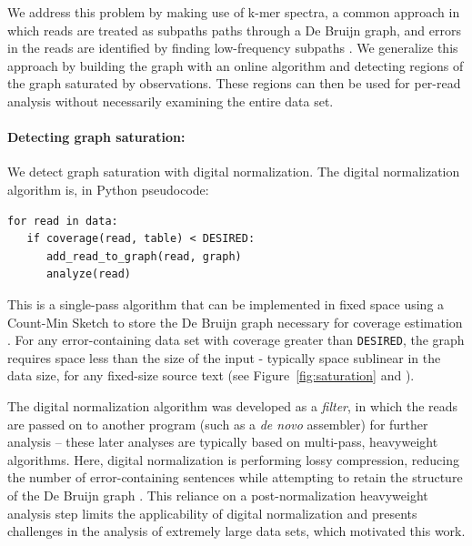 \documentclass{article}
\begin{document}
We address this problem by making use of k-mer spectra, a common
approach in which reads are treated as subpaths paths through a De
Bruijn graph, and errors in the reads are identified by finding
low-frequency subpaths \cite{Pevzner2001}.  We generalize this approach by
building the graph with an online algorithm and detecting regions of
the graph saturated by observations.  These regions can then be used
for per-read analysis without necessarily examining the entire data
set.

\paragraph{Detecting graph saturation:}
We detect graph saturation with digital normalization. The digital
normalization algorithm is, in Python pseudocode:
\begin{verbatim}
for read in data:
   if coverage(read, table) < DESIRED:
      add_read_to_graph(read, graph)
      analyze(read)
\end{verbatim}
This is a single-pass algorithm that can be implemented in fixed space
using a Count-Min Sketch to store the De Bruijn graph necessary for
coverage estimation \cite{Pell2012, Zhang2014}.  For any
error-containing data set with coverage greater than {\tt DESIRED},
the graph requires space less than the size of the input - typically
space sublinear in the data size, for any fixed-size source text (see
Figure~\ref{fig:saturation} and \cite{Zhang2014}).

The digital normalization algorithm was developed as a {\em filter},
in which the reads are passed on to another program (such as a {\em
  de novo} assembler) for further analysis -- these later analyses are
typically based on multi-pass, heavyweight algorithms.  Here, digital
normalization is performing lossy compression, reducing the number of
error-containing sentences while attempting to retain the structure of
the De Bruijn graph \cite{Brown2012, Zhang2014, Lowe2015}.  This reliance
on a post-normalization heavyweight analysis step limits the
applicability of digital normalization and presents challenges in the
analysis of extremely large data sets, which motivated this work.
\end{document}
